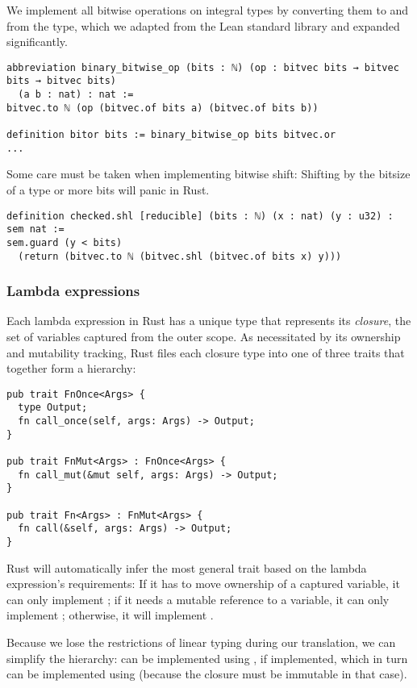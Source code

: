 We implement all bitwise operations on integral types by converting them to and
from the  type, which we adapted from the Lean standard
library and expanded significantly.

\begin{verbatim}
abbreviation binary_bitwise_op (bits : ℕ) (op : bitvec bits → bitvec bits → bitvec bits)
  (a b : nat) : nat :=
bitvec.to ℕ (op (bitvec.of bits a) (bitvec.of bits b))

definition bitor bits := binary_bitwise_op bits bitvec.or
...
\end{verbatim}

Some care must be taken when implementing bitwise shift: Shifting by the bitsize
of a type or more bits will panic in Rust.

\begin{verbatim}
definition checked.shl [reducible] (bits : ℕ) (x : nat) (y : u32) : sem nat :=
sem.guard (y < bits)
  (return (bitvec.to ℕ (bitvec.shl (bitvec.of bits x) y)))
\end{verbatim}

\subsubsection{Lambda expressions}

Each lambda expression in Rust has a unique type that represents its
\emph{closure}, the set of variables captured from the outer scope.
As necessitated by its ownership and mutability tracking, Rust files each
closure type into one of three traits that together form a hierarchy:

\begin{verbatim}
pub trait FnOnce<Args> {
  type Output;
  fn call_once(self, args: Args) -> Output;
}

pub trait FnMut<Args> : FnOnce<Args> {
  fn call_mut(&mut self, args: Args) -> Output;
}

pub trait Fn<Args> : FnMut<Args> {
  fn call(&self, args: Args) -> Output;
}
\end{verbatim}

Rust will automatically infer the most general trait based on the lambda
expression's requirements: If it has to move ownership of a captured variable, it
can only implement ; if it needs a mutable reference to a variable,
it can only implement ; otherwise, it will implement .

Because we lose the restrictions of linear typing during our translation, we can
simplify the hierarchy:  can be implemented using
, if implemented, which in turn can be implemented using
 (because the closure must be immutable in that case).


